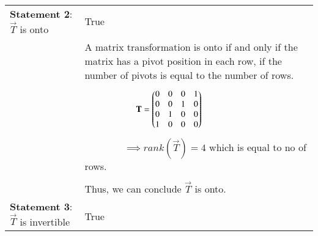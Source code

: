 \begin{longtable}{|p{5cm}|p{13cm}|}
	\hline
	\multirow{3}{*}{\textbf{Statement 2}:$\vec{T}$ is onto}&\\
    & True\\
	\hline
	&\\
	& A matrix transformation is onto if and only if the matrix has a pivot position in each row, if the number of pivots is equal to the number of rows.\\
	&\\
	& $\qquad\qquad\qquad\mathbf{T}=\begin{pmatrix}0&0&0&1\\0&0&1&0\\0&1&0&0\\1&0&0&0\end{pmatrix}$\\
	&\\
	& $\qquad\qquad\implies rank(\vec{T})= 4$ which is equal to no of rows.\\
	&\\
	& Thus, we can conclude $\vec{T}$ is onto.\\
	
	\hline
	\multirow{3}{*}{\textbf{Statement 3}:$\vec{T}$ is invertible} &\\
    & True\\
	\hline
	

\end{longtable}
